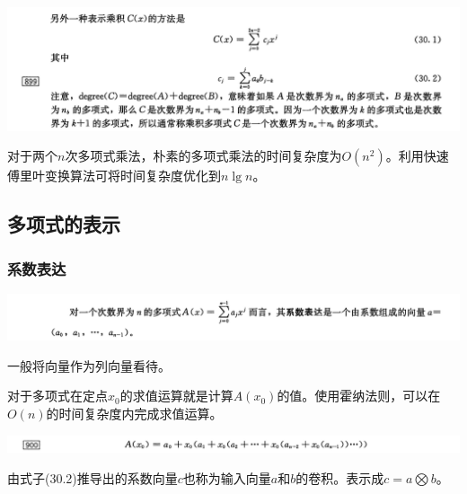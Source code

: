 \documentclass[11pt]{article}
\begin{document}
\includegraphics[width=.9\linewidth]{./Source/Polynomial/3.png}


对于两个\(n\)次多项式乘法，朴素的多项式乘法的时间复杂度为\(O(n^2)\)。利用快速傅里叶变换算法可将时间复杂度优化到\(n\lg n\)。

\subsection{多项式的表示}
\label{sec-1-3}
\subsubsection{系数表达}
\label{sec-1-3-1}

\includegraphics[width=.9\linewidth]{./Source/Polynomial/4.png}

一般将向量作为列向量看待。

对于多项式在定点\(x_0\)的求值运算就是计算\(A(x_0)\)的值。使用霍纳法则，可以在\(O(n)\)的时间复杂度内完成求值运算。

\includegraphics[width=.9\linewidth]{./Source/Polynomial/5.png}

由式子(30.2)推导出的系数向量\(c\)也称为输入向量\(a\)和\(b\)的卷积。表示成\(c=a \bigotimes b\)。
\end{document}
